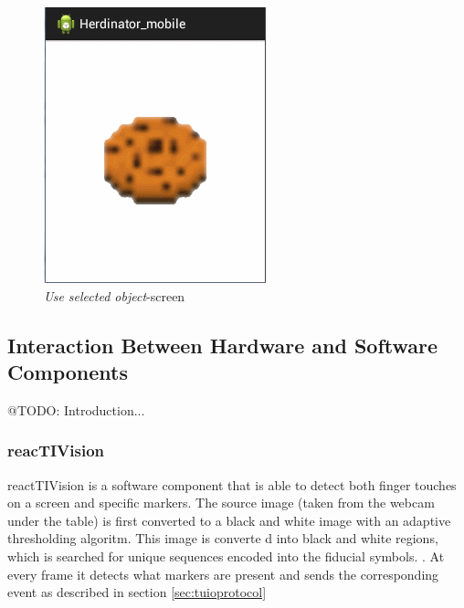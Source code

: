 \documentclass[a4paper,10pt]{report}
\begin{document}
\begin{figure}[ht]
\begin{minipage}[b]{0.30\linewidth}
			\includegraphics[width=\textwidth]{images/android-application-screen3.png}
			\caption{\emph{Use selected object}-screen}
			\label{fig:android-application-screen3}
		\end{minipage}
	\end{figure}

	\subsection{Interaction Between Hardware and Software Components}
	@TODO: Introduction...

	\subsubsection{reacTIVision}
	\label{sec:reactivision}
	reactTIVision is a software component that is able to detect both finger touches on a screen and specific markers. 
	The source image (taken from the webcam under the table) is first converted to a black and white image with an adaptive thresholding algoritm. 
	This image is converte	d into black and white regions, which is searched for unique sequences encoded into the fiducial symbols. \cite{reactivision}.
	At every frame it detects what markers are present and sends the corresponding event as described in section \ref{sec:tuioprotocol}
\end{document}
